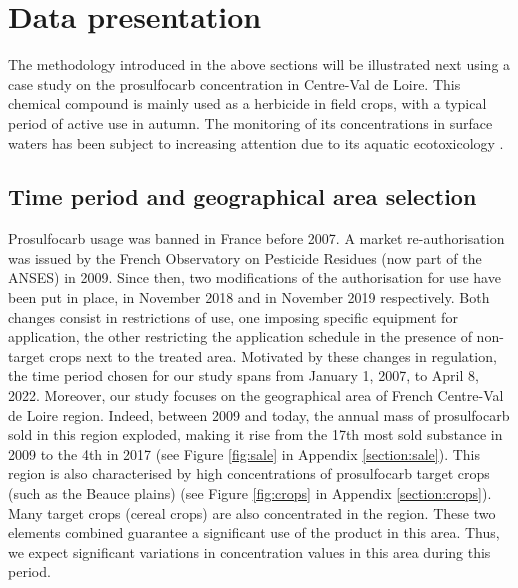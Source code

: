 \section{Data presentation}\label{section:data}

The methodology introduced in the above sections will be illustrated next using a case study on the prosulfocarb  concentration \cite{Prosulfocarb:NIH:url} in Centre-Val de Loire. This chemical compound is mainly used as a herbicide in field crops, with a typical period of active use in autumn. The monitoring of its concentrations in surface waters has been subject to increasing attention due to its aquatic ecotoxicology \cite{PPV,Prosulfocarb:PPDB}.

\subsection{Time period and geographical area selection}
\label{section:data-naiade}

Prosulfocarb usage was banned in France before 2007. A market re-authorisation was issued by the French Observatory on Pesticide Residues (now part of the ANSES) in 2009.
Since then, two modifications of the authorisation for use have been put in place, in November 2018 and in November 2019 respectively. Both changes consist in restrictions of use, one imposing specific equipment for application, the other restricting the application schedule in the presence of non-target crops next to the treated area. Motivated by these changes in regulation, the time period chosen for our study spans from January 1, 2007, to April 8, 2022.
Moreover, our study focuses on the geographical area of French Centre-Val de Loire region. Indeed, between 2009 and today, the annual mass of prosulfocarb sold in this region  exploded, making it rise from the 17th most sold substance in 2009 to the 4th in 2017 (see Figure \ref{fig:sale} in Appendix \ref{section:sale}). This region is also characterised by high concentrations of prosulfocarb target crops (such as the Beauce plains) (see Figure \ref{fig:crops} in Appendix \ref{section:crops}). 
Many target crops (cereal crops) are also concentrated in the region. These two elements combined guarantee a significant use of the product in this area.  
Thus, we expect significant variations in concentration values in this area during this period. 


